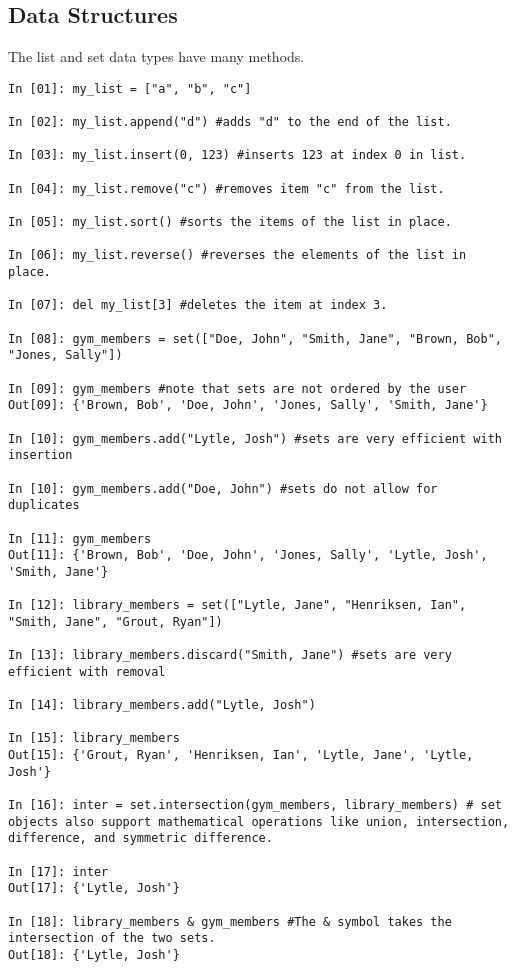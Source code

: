 \subsection*{Data Structures}
\begin{example}
The list and set data types have many methods. 
\begin{lstlisting}
In [01]: my_list = ["a", "b", "c"]

In [02]: my_list.append("d") #adds "d" to the end of the list.

In [03]: my_list.insert(0, 123) #inserts 123 at index 0 in list.

In [04]: my_list.remove("c") #removes item "c" from the list.

In [05]: my_list.sort() #sorts the items of the list in place.

In [06]: my_list.reverse() #reverses the elements of the list in place. 

In [07]: del my_list[3] #deletes the item at index 3.

In [08]: gym_members = set(["Doe, John", "Smith, Jane", "Brown, Bob", "Jones, Sally"])

In [09]: gym_members #note that sets are not ordered by the user
Out[09]: {'Brown, Bob', 'Doe, John', 'Jones, Sally', 'Smith, Jane'}

In [10]: gym_members.add("Lytle, Josh") #sets are very efficient with insertion

In [10]: gym_members.add("Doe, John") #sets do not allow for duplicates

In [11]: gym_members
Out[11]: {'Brown, Bob', 'Doe, John', 'Jones, Sally', 'Lytle, Josh', 'Smith, Jane'}

In [12]: library_members = set(["Lytle, Jane", "Henriksen, Ian", "Smith, Jane", "Grout, Ryan"])

In [13]: library_members.discard("Smith, Jane") #sets are very efficient with removal

In [14]: library_members.add("Lytle, Josh") 

In [15]: library_members
Out[15]: {'Grout, Ryan', 'Henriksen, Ian', 'Lytle, Jane', 'Lytle, Josh'}

In [16]: inter = set.intersection(gym_members, library_members) # set objects also support mathematical operations like union, intersection, difference, and symmetric difference.

In [17]: inter
Out[17]: {'Lytle, Josh'}

In [18]: library_members & gym_members #The & symbol takes the intersection of the two sets.
Out[18]: {'Lytle, Josh'}


\end{lstlisting}

\end{example}


